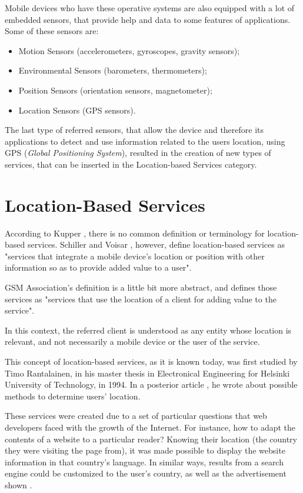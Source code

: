 Mobile devices who have these operative systems are also equipped with a lot of embedded sensors, that provide help and data to some features of applications. Some of these sensors are:

\begin{itemize}
\item Motion Sensors (accelerometers, gyroscopes, gravity sensors);
\item Environmental Sensors (barometers, thermometers);
\item Position Sensors (orientation sensors, magnetometer);
\item Location Sensors (GPS sensors).
\end{itemize}

The last type of referred sensors, that allow the device and therefore its applications to detect and use information related to the users location, using GPS (\emph{Global Positioning System}), resulted in the creation of new types of services, that can be inserted in the Location-based Services category.

\section{Location-Based Services}\label{sec:lbs}

According to Kupper \cite{kn:Ku05}, there is no common definition or terminology for location-based services. Schiller and Voisar \cite{kn:SV04}, however, define location-based services as "services that integrate a mobile device's location or position with other information so as to provide added value to a user". 

GSM Association's definition is a little bit more abstract, and defines those services as "services that use the location of a client for adding value to the service".

In this context, the referred client is understood as any entity whose location is relevant, and not necessarily a mobile device or the user of the service.

This concept of location-based services, as it is known today, was first studied by Timo Rantalainen, in his master thesis in Electronical Engineering for Helsinki University of Technology, in 1994. In a posterior article \cite{kn:SR95}, he wrote about possible methods to determine users' location.

These services were created due to a set of particular questions that web developers faced with the growth of the Internet. For instance, how to adapt the contents of a website to a particular reader? Knowing their location (the country they were visiting the page from), it was made possible to display the website information in that country's language. In similar ways, results from a search engine could be customized to the user's country, as well as the advertisement shown \cite{kn:BWD11}.

